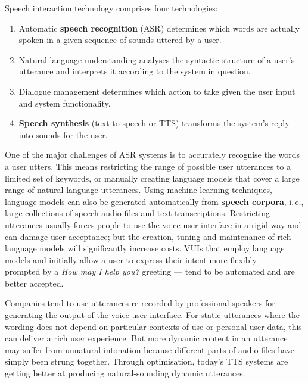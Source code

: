 \begin{multicols}{2}
Speech interaction technology comprises four technologies: 

\begin{enumerate}
\item Automatic \textbf{speech recognition} (ASR) determines which words are actually spoken in a given sequence of sounds uttered by a user.  
\item Natural language understanding analyses the syntactic structure of a user’s utterance and interprets it according to the system in question.
\item Dialogue management determines which action to take given the user input and system functionality.   
\item \textbf{Speech synthesis} (text-to-speech or TTS) transforms the system’s reply into sounds for the user.
\end{enumerate}

One of the major challenges of ASR systems is to accurately recognise the words a user utters. This means restricting the range of possible user utterances to a limited set of keywords, or manually creating language models that cover a large range of natural language utterances. Using machine learning techniques, language models can also be generated automatically from \textbf{speech corpora}, i.\,e., large collections of speech audio files and text transcriptions. Restricting utterances usually forces people to use the voice user interface in a rigid way and can damage user acceptance; but the creation, tuning and maintenance of rich language models will significantly increase costs. VUIs that employ language models and initially allow a user to express their intent more flexibly — prompted by a \textit{How may I help you?} greeting — tend to be automated and are better accepted.

Companies tend to use utterances re-recorded by professional speakers for generating the output of the voice user interface. For static utterances where the wording does not depend on particular contexts of use or personal user data, this can deliver a rich user experience. But more dynamic content in an utterance may suffer from unnatural intonation because different parts of audio files have simply been strung together. Through optimisation, today’s TTS systems are getting better at producing natural-sounding dynamic utterances.



\end{multicols}
